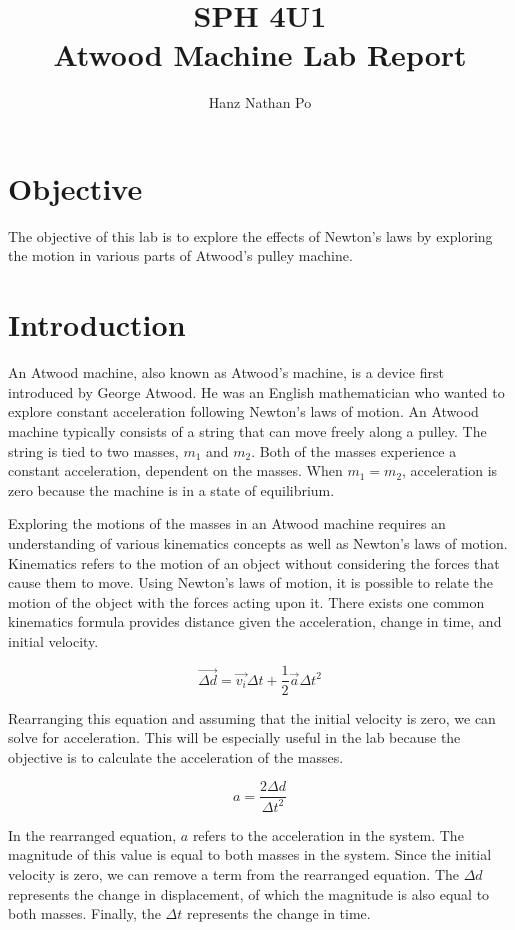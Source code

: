 \documentclass[10pt,twocolumn,letterpaper]{article}
\title{
		\usefont{OT1}{bch}{b}{n}
		\normalfont \normalsize \textsc{SPH 4U1} \\ [10pt]
		\huge Atwood Machine Lab Report \\
}
\author[1]{Hanz Nathan Po}
\begin{document}
\maketitle

\section{Objective}
The objective of this lab is to explore the effects of Newton’s laws by exploring the motion in various parts of Atwood’s pulley machine.

\section{Introduction}
An Atwood machine, also known as Atwood’s machine, is a device first introduced by George Atwood. He was an English mathematician who wanted to explore constant acceleration following Newton’s laws of motion. An Atwood machine typically consists of a string that can move freely along a pulley. The string is tied to two masses, \(m_{1}\) and \(m_{2}\). Both of the masses experience a constant acceleration, dependent on the masses. When \(m_{1} = m_{2}\), acceleration is zero because the machine is in a state of equilibrium. 

Exploring the motions of the masses in an Atwood machine requires an understanding of various kinematics concepts as well as Newton’s laws of motion. Kinematics refers to the motion of an object without considering the forces that cause them to move. Using Newton’s laws of motion, it is possible to relate the motion of the object with the forces acting upon it. There exists one common kinematics formula provides distance given the acceleration, change in time, and initial velocity. 

\begin{equation}
    \overrightarrow{\Delta d}=\overrightarrow{v_{i}}\Delta t+\frac{1}{2}\overrightarrow{a}\Delta t^2
\end{equation}

Rearranging this equation and assuming that the initial velocity is zero, we can solve for acceleration. This will be especially useful in the lab because the objective is to calculate the acceleration of the masses.

\begin{equation}
    a=\frac{2\Delta d}{\Delta t^2}
\end{equation}

In the rearranged equation, \(a\) refers to the acceleration in the system. The magnitude of this value is equal to both masses in the system. Since the initial velocity is zero, we can remove a term from the rearranged equation. The \(\Delta d\) represents the change in displacement, of which the magnitude is also equal to both masses. Finally, the \(\Delta t\) represents the change in time.
\end{document}
